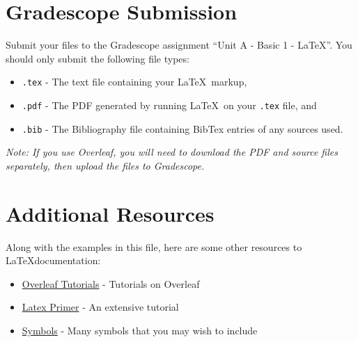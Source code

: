 \documentclass[10pt]{article}
\begin{document}
\section*{Gradescope Submission}
Submit your files to the Gradescope assignment ``Unit A - Basic 1 - LaTeX''.  You should only submit the following file types:
\begin{itemize}
    \item \verb|.tex| - The text file containing your \LaTeX~markup,
    \item \verb|.pdf| - The PDF generated by running \LaTeX~on your \verb|.tex| file, and
    \item \verb|.bib| - The Bibliography file containing BibTex entries of any sources used.
\end{itemize}
\textit{Note: If you use Overleaf, you will need to download the PDF and source files separately, then upload the files to Gradescope.}

\section*{Additional Resources}

Along with the examples in this file, here are some other resources to \LaTeX documentation:

\begin{itemize}
    \item \href{https://www.overleaf.com/learn/latex/Tutorials}{Overleaf Tutorials} - Tutorials on Overleaf
    \item \href{https://www.maths.tcd.ie/~dwilkins/LaTeXPrimer/}{Latex Primer} - An extensive tutorial
    \item \href{http://www.cs.put.poznan.pl/ksiek/latexmath.html#set-theory}{Symbols} - Many symbols that you may wish to include
\end{itemize}



\end{document}
